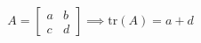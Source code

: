 \documentclass[preview]{standalone}
\begin{document}
\begin{align*}
A = \begin{bmatrix} a & b \\ c & d \end{bmatrix} \implies \text{tr}(A) = a+d
\end{align*}
\end{document}
